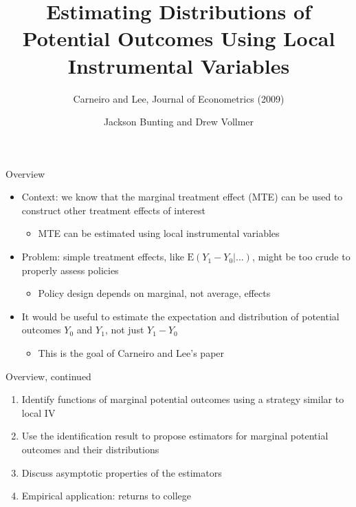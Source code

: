 \documentclass{beamer}
\newcommand{\E}{\mathrm{E}} %
\begin{document}
\title[Distributions of Potential Outcomes]{Estimating Distributions
  of Potential Outcomes Using Local Instrumental Variables}
\subtitle{Carneiro and Lee, Journal of Econometrics (2009)}
\author[]{Jackson Bunting and Drew Vollmer}
\frame{\maketitle}


\begin{frame}{Overview}

\begin{itemize}

\item Context: we know that the marginal treatment effect (MTE) can be
  used to construct other treatment effects of interest
\begin{itemize}
\item MTE can be estimated using local instrumental variables
\end{itemize}

\pause

\item Problem: simple treatment effects, like $\E(Y_1 - Y_0 | \dots)$,
  might be too crude to properly assess policies
\begin{itemize}
\item Policy design depends on marginal, not average, effects
\end{itemize}

\pause

\item It would be useful to estimate the expectation and distribution
  of potential outcomes $Y_0$ and $Y_1$, not just $Y_1 - Y_0$
\begin{itemize}
\item This is the goal of Carneiro and Lee's paper
\end{itemize}

\end{itemize}

\end{frame}


\begin{frame}{Overview, continued}

\begin{enumerate}

\item Identify functions of marginal potential outcomes using a
  strategy similar to local IV

\item Use the identification result to propose estimators for marginal
  potential outcomes and their distributions

\item Discuss asymptotic properties of the estimators

\item Empirical application: returns to college

\end{enumerate}

\end{frame}
\end{document}
